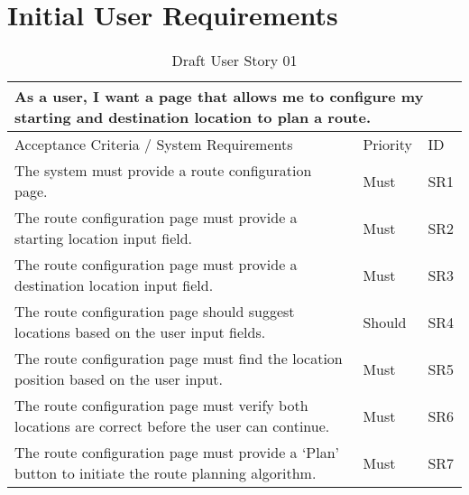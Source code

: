\chapter{Initial User Requirements}
\label{appendix:initial-user-requirements}

\begin{table}[!h]
\caption{Draft User Story 01}
\label{appendix:tab:user-story-01}
\begin{tabular}{ p{11cm} p{1cm}  p{1cm} }
\hline
\multicolumn{3}{p{13cm}}{As a user, I want a page that allows me to configure my starting and destination location to plan a route.}\\ 
\hline
Acceptance Criteria / System Requirements & Priority & ID\\
\hline
The system must provide a route configuration page. & Must & SR1\\
The route configuration page must provide a starting location input field. & Must & SR2\\
The route configuration page must provide a destination location input field. & Must & SR3\\ 
The route configuration page should suggest locations based on the user input fields. & Should & SR4\\ 
The route configuration page must find the location position based on the user input. & Must & SR5\\ 
The route configuration page must verify both locations are correct before the user can continue. & Must & SR6\\ 
The route configuration page must provide a ‘Plan’ button to initiate the route planning algorithm. & Must & SR7\\ 
\hline
\end{tabular}
\end{table}

